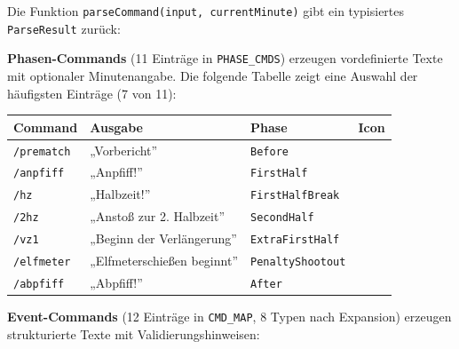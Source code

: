 Die Funktion \texttt{parseCommand(input,\ currentMinute)} gibt ein
typisiertes \texttt{ParseResult} zurück:

\begin{Shaded}
\begin{Highlighting}[]
 
\OperatorTok{:} \OperatorTok{;}
\OperatorTok{:} \OperatorTok{;}
\OperatorTok{:} \NormalTok{[]}\OperatorTok{;}
\OperatorTok{:} \OperatorTok{;}
\OperatorTok{:}\NormalTok{ \{}
\OperatorTok{:} \OperatorTok{;}
\OperatorTok{:}  \OperatorTok{|} \OperatorTok{;}
\OperatorTok{:}  \OperatorTok{|} \OperatorTok{;}
\NormalTok{  \}}\OperatorTok{;}
\NormalTok{\}}
\end{Highlighting}
\end{Shaded}

\textbf{Phasen-Commands} (11 Einträge in \texttt{PHASE\_CMDS}) erzeugen
vordefinierte Texte mit optionaler Minutenangabe. Die folgende Tabelle
zeigt eine Auswahl der häufigsten Einträge (7 von 11):

{\def\LTcaptype{none} %
\begin{longtable}[]{@{}llll@{}}
\toprule\noalign{}
Command & Ausgabe & Phase & Icon \\
\midrule\noalign{}
\endhead
\bottomrule\noalign{}
\endlastfoot
\texttt{/prematch} & „Vorbericht'' & \texttt{Before} & 📣 \\
\texttt{/anpfiff} & „Anpfiff!'' & \texttt{FirstHalf} & 📣 \\
\texttt{/hz} & „Halbzeit!'' & \texttt{FirstHalfBreak} & 🔔 \\
\texttt{/2hz} & „Anstoß zur 2. Halbzeit'' & \texttt{SecondHalf} & 📣 \\
\texttt{/vz1} & „Beginn der Verlängerung'' & \texttt{ExtraFirstHalf} &
📣 \\
\texttt{/elfmeter} & „Elfmeterschießen beginnt'' &
\texttt{PenaltyShootout} & 🥅 \\
\texttt{/abpfiff} & „Abpfiff!'' & \texttt{After} & 📣 \\
\end{longtable}
}

\textbf{Event-Commands} (12 Einträge in \texttt{CMD\_MAP}, 8 Typen nach
Expansion) erzeugen strukturierte Texte mit Validierungshinweisen:

